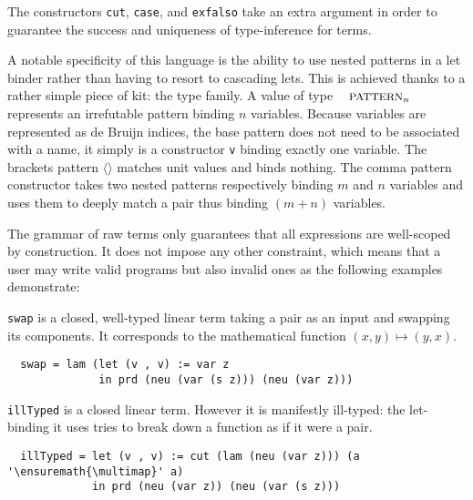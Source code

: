 The constructors \texttt{cut}, \texttt{case}, and \texttt{exfalso}
take an extra \Type{} argument in order to guarantee the success
and uniqueness of type-inference for \Inferable{} terms.

A notable specificity of this language is the ability to use nested
patterns in a let binder rather than having to resort to cascading
lets. This is achieved thanks to a rather simple piece of kit: the
\Pattern{} type family. A value of type $\Pattern{n}$ represents an
irrefutable pattern binding $n$ variables. Because variables are
represented as de Bruijn indices, the base pattern does not need to
be associated with a name, it simply is a constructor \texttt{v}
binding exactly one variable. The brackets pattern \texttt{\ensuremath{\langle}\ensuremath{\rangle}} matches
unit values and binds nothing. The comma pattern constructor takes
two nested patterns respectively binding $m$ and $n$ variables and
uses them to deeply match a pair thus binding $(m + n)$ variables.


The grammar of raw terms only guarantees that all expressions are
well-scoped by construction. It does not impose any other constraint,
which means that a user may write valid programs but also invalid
ones as the following examples demonstrate:

\begin{example}\label{example:swap}
\texttt{swap} is a closed, well-typed linear term taking a pair as
an input and swapping its components. It corresponds to the mathematical
function $(x, y) \mapsto (y, x)$.
\begin{lstlisting}
  swap = lam (let (v , v) := var z
              in prd (neu (var (s z))) (neu (var z)))
\end{lstlisting}
\end{example}

\begin{example}\label{example:illTyped}
\texttt{illTyped} is a closed linear term. However it is manifestly
ill-typed: the let-binding it uses tries to break down a function as
if it were a pair.
\begin{lstlisting}
  illTyped = let (v , v) := cut (lam (neu (var z))) (a '\ensuremath{\multimap}' a)
             in prd (neu (var z)) (neu (var (s z)))
\end{lstlisting}
\end{example}

